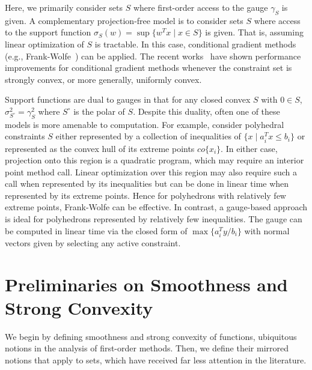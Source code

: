 \documentclass[sn-mathphys,Numbered]{sn-jnl}%
\begin{document}
Here, we primarily consider sets $S$ where first-order access to the gauge $\gamma_S$ is given. A complementary projection-free model is to consider sets $S$ where access to the support function $\sigma_S(w) = \sup\{w^Tx \mid x\in S\}$ is given. That is, assuming linear optimization of $S$ is tractable. In this case, conditional gradient methods (e.g., Frank-Wolfe~\cite{frank1956algorithm}) can be applied. 
The recent works~\cite{pena2023affine,kerdreux2021projection} have shown performance improvements for conditional gradient methods whenever the constraint set is strongly convex, or more generally, uniformly convex. 

Support functions are dual to gauges in that for any closed convex $S$ with $0\in S$, $\sigma_{S^\circ}^2 = \gamma_S^2$ where $S^\circ$ is the polar of $S$. Despite this duality, often one of these models is more amenable to computation.
For example, consider polyhedral constraints $S$ either represented by a collection of inequalities of $\{x \mid a_i^Tx\leq b_i\}$ or represented as the convex hull of its extreme points $co\{x_i\}$. In either case, projection onto this region is a quadratic program, which may require an interior point method call. Linear optimization over this region may also require such a call when represented by its inequalities but can be done in linear time when represented by its extreme points. Hence for polyhedrons with relatively few extreme points, Frank-Wolfe can be effective.
In contrast, a gauge-based approach is ideal for polyhedrons represented by relatively few inequalities. The gauge can be computed in linear time via the closed form of $\max\{a_i^Ty/b_i\}$ with normal vectors given by selecting any active constraint.

\section{Preliminaries on Smoothness and Strong Convexity}\label{sec:prelim}
We begin by defining smoothness and strong convexity of functions, ubiquitous notions in the analysis of first-order methods. Then, we define their mirrored notions that apply to sets, which have received far less attention in the literature.
\end{document}
